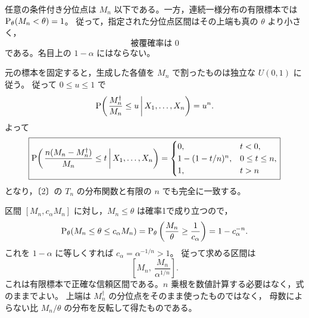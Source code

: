 \documentclass[a4paper,11pt]{ltjsarticle}
\begin{document}
任意の条件付き分位点は $M_n$ 以下である。一方，連続一様分布の有限標本では
$\operatorname{P}_\theta(M_n<\theta)=1$。
従って，指定された分位点区間はその上端も真の $\theta$ より小さく，
\[
\boxed{\text{被覆確率は }0}
\]
である。名目上の $1-\alpha$ にはならない。

元の標本を固定すると，生成した各値を $M_n$ で割ったものは独立な $U(0,1)$ に従う。
従って $0\leq u\leq1$ で
\[
\operatorname{P}\!\left(\left.\frac{M_n^\dagger}{M_n}\leq u\,\right|X_1,\ldots,X_n\right)=u^n.
\]
よって
\[
\boxed{
\operatorname{P}\!\left(\left.\frac{n(M_n-M_n^\dagger)}{M_n}\leq t\,\right|X_1,\ldots,X_n\right)
=\begin{cases}
0,&t<0,\\
1-(1-t/n)^n,&0\leq t\leq n,\\
1,&t>n
\end{cases}}
\]
となり，〔2〕の $T_n$ の分布関数と有限の $n$ でも完全に一致する。

区間 $[M_n,c_\alpha M_n]$ に対し，$M_n\leq\theta$ は確率1で成り立つので，
\[
\operatorname{P}_\theta(M_n\leq\theta\leq c_\alpha M_n)
=\operatorname{P}_\theta\left(\frac{M_n}{\theta}\geq\frac1{c_\alpha}\right)
=1-c_\alpha^{-n}.
\]
これを $1-\alpha$ に等しくすれば $c_\alpha=\alpha^{-1/n}>1$。
従って求める区間は
\[
\boxed{\left[M_n,\ \frac{M_n}{\alpha^{1/n}}\right]}.
\]
これは有限標本で正確な信頼区間である。$n$ 乗根を数値計算する必要はなく，式のままでよい。
上端は $M_n^\dagger$ の分位点をそのまま使ったものではなく，
母数によらない比 $M_n/\theta$ の分布を反転して得たものである。
\end{document}
